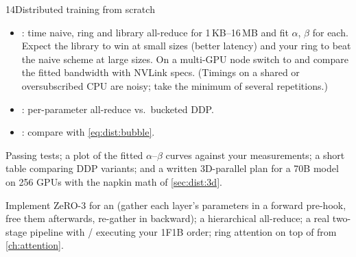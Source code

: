 \begin{labbox}{14}{Distributed training from scratch}
\begin{itemize}
\item {}: time naive, ring and library all-reduce for
  1\,KB--16\,MB and fit $\alpha$, $\beta$ for each. Expect the library to win at small sizes
  (better latency) and your ring to beat the naive scheme at large sizes. On a multi-GPU node
  switch to  and compare the fitted bandwidth with NVLink specs. (Timings on
  a shared or oversubscribed CPU are noisy; take the minimum of several repetitions.)
\item {}: per-parameter all-reduce vs.\ bucketed DDP.
\item {}: compare with \cref{eq:dist:bubble}.
\end{itemize}

Passing tests; a plot of the fitted $\alpha$--$\beta$ curves against your measurements; a short
table comparing DDP variants; and a written 3D-parallel plan for a 70B model on 256 GPUs with
the napkin math of \cref{sec:dist:3d}.

Implement ZeRO-3 for an  (gather each layer's parameters in a forward
pre-hook, free them afterwards, re-gather in backward); a hierarchical all-reduce; a real
two-stage pipeline with / executing your 1F1B order; ring
attention on top of  from \cref{ch:attention}.
\end{labbox}
